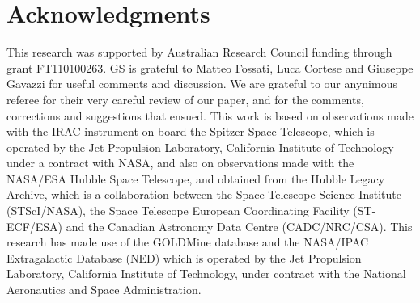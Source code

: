 \documentclass[useAMS,usenatbib,article]{mnras}
\begin{document}
\section{Acknowledgments}
This research was supported by Australian Research Council funding through grant FT110100263. 
GS is grateful to Matteo Fossati, Luca Cortese and Giuseppe Gavazzi for useful comments and discussion. 
We are grateful to our anynimous referee for their very careful review of our paper, 
and for the comments, corrections and suggestions that ensued. 
This work is based on observations made with the IRAC instrument \citep{fazio2004IRAC} on-board the Spitzer Space Telescope, 
which is operated by the Jet Propulsion Laboratory, California Institute of Technology under a contract with NASA, 
and also on observations made with the NASA/ESA Hubble Space Telescope, 
and obtained from the Hubble Legacy Archive, 
which is a collaboration between the Space Telescope Science Institute (STScI/NASA), 
the Space Telescope European Coordinating Facility (ST-ECF/ESA) and the Canadian Astronomy Data Centre (CADC/NRC/CSA).
This research has made use of the GOLDMine database \citep{goldmine} and the NASA/IPAC Extragalactic Database (NED) 
which is operated by the Jet Propulsion Laboratory, California Institute of Technology, 
under contract with the National Aeronautics and Space Administration. 




\label{lastpage}

\clearpage
\end{document}
